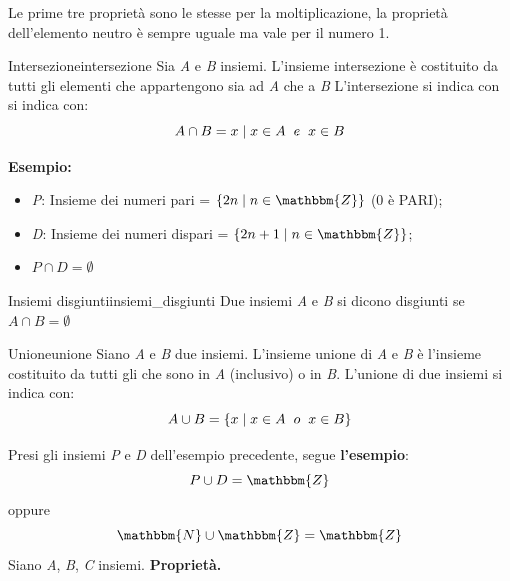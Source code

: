 \documentclass[12pt, letterpaper]{report}
\newcounter{definition}
\newcommand{\nmu}{}
\begin{document}
	Le prime tre proprietà sono le stesse per la moltiplicazione, la proprietà dell'elemento neutro è sempre uguale ma vale per il numero 1.
	\begin{definition}{\nmu Intersezione}{intersezione}
		Sia \textit{A} e \textit{B} insiemi. L'insieme intersezione è costituito da tutti gli elementi che appartengono sia ad \textit{A} che a \textit{B}
		L'intersezione si indica con si indica con:
		\[
		A \cap B = {x \mid x \in A \hspace{0.2cm} e \hspace{0.2cm}x \in B}
		\]
	\end{definition}
	\noindent
	\textbf{Esempio: }
	\begin{itemize}
		\item \textit{P}: Insieme dei numeri pari = $\{2n \mid n \in \mathbbm{Z}\}$ (0 è PARI);
		\item \textit{D}: Insieme dei numeri dispari = $\{2n + 1 \mid n \in \mathbbm{Z}\}$;
		\item $P \cap D = \emptyset$
	\end{itemize}
	\begin{definition}{\nmu Insiemi disgiunti}{insiemi_disgiunti}
		Due insiemi \textit{A} e \textit{B} si dicono disgiunti se $A \cap B = \emptyset$
	\end{definition}
	\begin{definition}{\nmu Unione}{unione}
		Siano \textit{A} e \textit{B} due insiemi. L'insieme unione di \textit{A} e \textit{B} è l'insieme costituito da tutti gli che sono in \textit{A} (inclusivo) o in \textit{B}.
		L'unione di due insiemi si indica con:
		\[
			A \cup B = \{x \mid x \in A \hspace{0.2cm} o \hspace{0.2cm} x \in B\}
		\]
	\end{definition}
	\noindent
	Presi gli insiemi \textit{P} e \textit{D} dell'esempio precedente, segue \textbf{l'esempio}:
	\[P \cup D = \mathbbm{Z}\]
	oppure
	\[\mathbbm{N} \cup \mathbbm{Z} = \mathbbm{Z}\]
	Siano \textit{A}, \textit{B}, \textit{C} insiemi. \textbf{Proprietà.}
\end{document}
